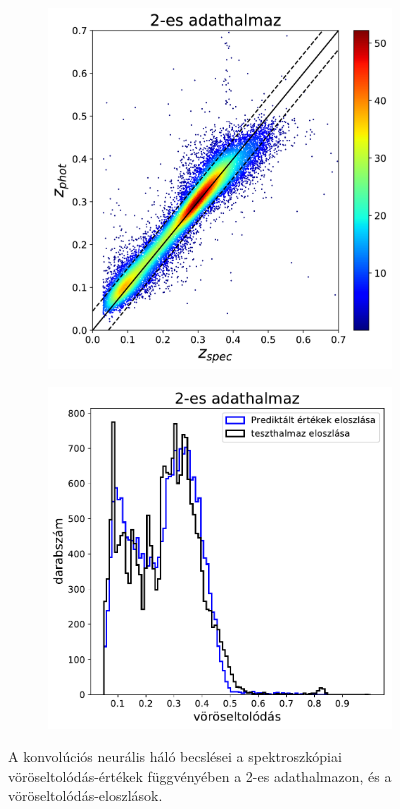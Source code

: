 \documentclass[12pt,letterpaper,twoside,openright]{book}
\begin{document}
\begin{figure}[h!]
 \centering
  \begin{subfigure}[b]{0.3\textwidth}
    \includegraphics[width=\textwidth, height = \textwidth]{Figures/plotCNN2.png}
    \label{fig:1}
  \end{subfigure}
  \hspace{1.7cm}
  \begin{subfigure}[b]{0.3\textwidth}
    \includegraphics[width=\textwidth, height = \textwidth]{Figures/histCNN2.pdf}
    \label{fig:2}
  \end{subfigure}
  \caption{A konvolúciós neurális háló becslései a spektroszkópiai vöröseltolódás-értékek függvényében a 2-es adathalmazon, és a vöröseltolódás-eloszlások.}
\label{cnn}
\end{figure}
\end{document}
